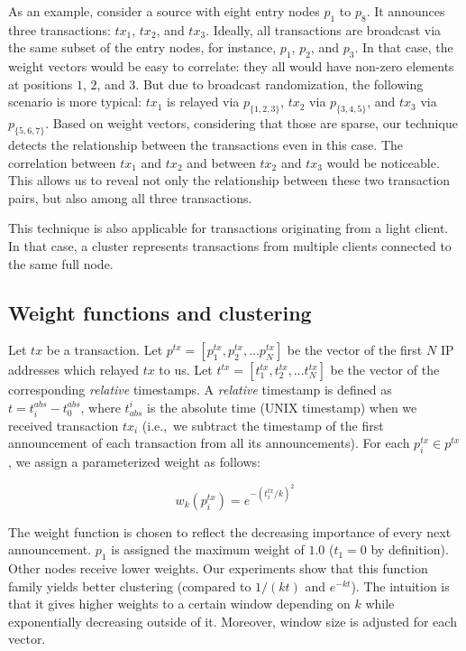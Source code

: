 As an example, consider a source with eight entry nodes $p_1$ to $p_8$.
It announces three transactions: $tx_1$, $tx_2$, and $tx_3$.
Ideally, all transactions are broadcast via the same subset of the entry nodes, for instance, $p_1$, $p_2$, and $p_3$.
In that case, the weight vectors would be easy to correlate: they all would have non-zero elements at positions $1$, $2$, and $3$.
But due to broadcast randomization, the following scenario is more typical: $tx_1$ is relayed via $p_{\{1,2,3\}}$, $tx_2$ via $p_{\{3,4,5\}}$, and $tx_3$ via $p_{\{5,6,7\}}$.
Based on weight vectors, considering that those are sparse, our technique detects the relationship between the transactions even in this case.
The correlation between $tx_1$ and $tx_2$ and between $tx_2$ and $tx_3$ would be noticeable.
This allows us to reveal not only the relationship between these two transaction pairs, but also among all three transactions.

This technique is also applicable for transactions originating from a light client.
In that case, a cluster represents transactions from multiple clients connected to the same full node.


\subsection{Weight functions and clustering}

Let $tx$ be a transaction.
Let $p^{tx} = [p^{tx}_1, p^{tx}_2, ... p^{tx}_N]$ be the vector of the first $N$ IP addresses which relayed $tx$ to us.
Let $t^{tx} = [t^{tx}_1, t^{tx}_2, ... t^{tx}_N]$ be the vector of the corresponding \textit{relative} timestamps.
A \textit{relative} timestamp is defined as $t = t^{abs}_i - t^{abs}_0$, where $t_{abs}^i$ is the absolute time (UNIX timestamp) when we received transaction $tx_i$ (i.e.,~we subtract the timestamp of the first announcement of each transaction from all its announcements).
For each $p^{tx}_i \in p^{tx}$, we assign a parameterized weight as follows:

\[
w_k(p^{tx}_i) = e^{-(t^{tx}_i/k)^2}
\]

The weight function is chosen to reflect the decreasing importance of every next announcement.
$p_1$ is assigned the maximum weight of $1.0$ ($t_1=0$ by definition).
Other nodes receive lower weights.
Our experiments show that this function family yields better clustering (compared to $1/(kt)$ and $e^{-kt}$).
The intuition is that it gives higher weights to a certain window depending on $k$ while exponentially decreasing outside of it.
Moreover, window size is adjusted for each vector.

